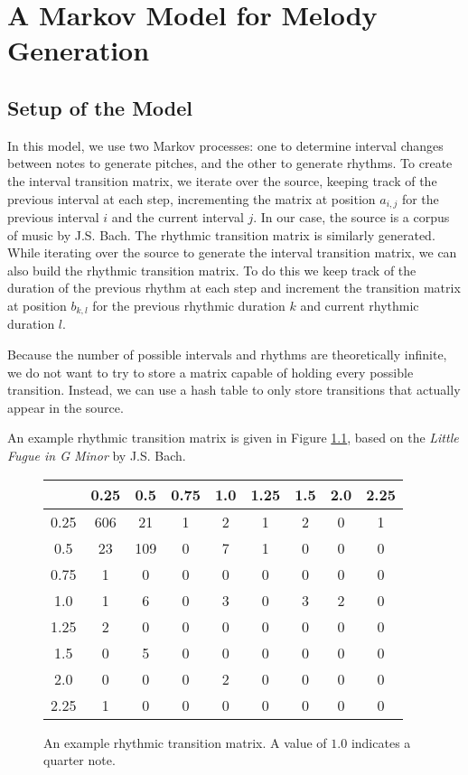 \chapter{A Markov Model for Melody Generation} \label{markov}

\section{Setup of the Model} \label{markov:setup}

In this model, we use two Markov processes: one to determine interval changes between notes to generate pitches, and the other to generate rhythms.
To create the interval transition matrix, we iterate over the source, keeping track of the previous interval at each step, incrementing the matrix at position $a_{i,j}$ for the previous interval $i$ and the current interval $j$.
In our case, the source is a corpus of music by J.S. Bach.
The rhythmic transition matrix is similarly generated.
While iterating over the source to generate the interval transition matrix, we can also build the rhythmic transition matrix.
To do this we keep track of the duration of the previous rhythm at each step and increment the transition matrix at position $b_{k,l}$ for the previous rhythmic duration $k$ and current rhythmic duration $l$.

Because the number of possible intervals and rhythms are theoretically infinite, we do not want to try to store a matrix capable of holding every possible transition.
Instead, we can use a hash table to only store transitions that actually appear in the source.

An example rhythmic transition matrix is given in Figure \ref{fig:rhythmTransitionMatrix}, based on the \textit{Little Fugue in G Minor} by J.S. Bach.

\begin{figure}
	\centering
	\begin{tabular}{c | c c c c c c c c}
		& 0.25 & 0.5 & 0.75 & 1.0 & 1.25 & 1.5 & 2.0 & 2.25\\
		\hline
		0.25 & 606 & 21 & 1 & 2 & 1 & 2 & 0 & 1\\
		0.5 & 23 & 109 & 0 & 7 & 1 & 0 & 0 & 0\\
		0.75 & 1 & 0 & 0 & 0 & 0 & 0 & 0 & 0\\
		1.0 & 1 & 6 & 0 & 3 & 0 & 3 & 2 & 0\\
		1.25 & 2 & 0 & 0 & 0 & 0 & 0 & 0 & 0\\
		1.5 & 0 & 5 & 0 & 0 & 0 & 0 & 0 & 0\\
		2.0 & 0 & 0 & 0 & 2 & 0 & 0 & 0 & 0\\
		2.25 & 1 & 0 & 0 & 0 & 0 & 0 & 0 & 0
	\end{tabular}
	\caption{An example rhythmic transition matrix. A value of $1.0$ indicates a quarter note.}
	\label{fig:rhythmTransitionMatrix}
\end{figure}

